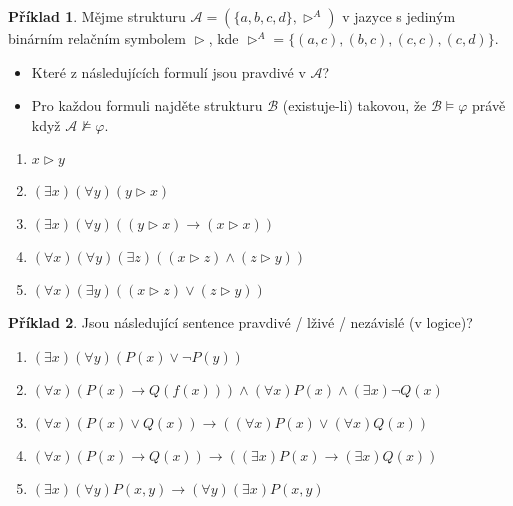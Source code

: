 \documentclass[a4paper]{article}
\theoremstyle{definition}
\newtheorem{problem}{Příklad}
\begin{document}
    
\medskip\begin{problem}
    Mějme strukturu $\mathcal{A}=(\{a,b,c,d\},\vartriangleright^{A})$ v jazyce s jediným binárním relačním symbolem $\vartriangleright$, kde $\vartriangleright^{A}=\{(a,c), (b,c), (c,c), (c,d)\}$. 
    \begin{itemize}
        \item Které z následujících formulí jsou pravdivé v $\mathcal A$? 
        \item Pro každou formuli najděte strukturu $\mathcal{B}$ (existuje-li) takovou, že $\mathcal{B}\models \varphi$ právě když $\mathcal{A}\not\models \varphi$.
    \end{itemize}    
    \begin{enumerate}
       \item $x \vartriangleright y$
       \item $(\exists x)(\forall y)(y \vartriangleright x)$
       \item $(\exists x)(\forall y)((y \vartriangleright x) \to (x \vartriangleright x))$
       \item $(\forall x)(\forall y)(\exists z)((x \vartriangleright z)\wedge(z \vartriangleright y))$
       \item $(\forall x)(\exists y)((x \vartriangleright z)\vee(z \vartriangleright y))$
    \end{enumerate}
\end{problem}
    
    
\medskip\begin{problem}
    Jsou následující sentence pravdivé / lživé / nezávislé (v logice)?
    \begin{enumerate}
     \item $(\exists x)(\forall y)(P(x) \vee \neg P(y))$
    \item $(\forall x)(P(x)\to Q(f(x))) \wedge (\forall x)P(x) \wedge (\exists x)\neg Q(x)$
      \item $(\forall x)(P(x) \vee Q(x)) \to ((\forall x)P(x) \vee (\forall x)Q(x))$
       \item $(\forall x)(P(x)\to Q(x)) \to ((\exists x)P(x)\to(\exists x)Q(x))$
    \item $(\exists x)(\forall y)P(x,y) \to (\forall y)(\exists x)P(x,y)$
    \end{enumerate}
\end{problem}
    
\end{document}
